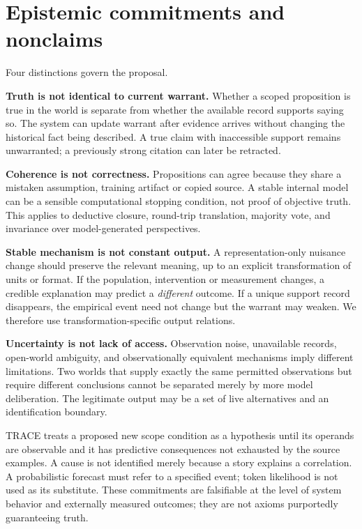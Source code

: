 \documentclass[11pt,a4paper]{article}
\begin{document}
\section{Epistemic commitments and
nonclaims}\label{epistemic-commitments-and-nonclaims}

Four distinctions govern the proposal.

\textbf{Truth is not identical to current warrant.} Whether a scoped
proposition is true in the world is separate from whether the available
record supports saying so. The system can update warrant after evidence
arrives without changing the historical fact being described. A true
claim with inaccessible support remains unwarranted; a previously strong
citation can later be retracted.

\textbf{Coherence is not correctness.} Propositions can agree because
they share a mistaken assumption, training artifact or copied source. A
stable internal model can be a sensible computational stopping
condition, not proof of objective truth. This applies to deductive
closure, round-trip translation, majority vote, and invariance over
model-generated perspectives.

\textbf{Stable mechanism is not constant output.} A representation-only
nuisance change should preserve the relevant meaning, up to an explicit
transformation of units or format. If the population, intervention or
measurement changes, a credible explanation may predict a
\emph{different} outcome. If a unique support record disappears, the
empirical event need not change but the warrant may weaken. We therefore
use transformation-specific output relations.

\textbf{Uncertainty is not lack of access.} Observation noise,
unavailable records, open-world ambiguity, and observationally
equivalent mechanisms imply different limitations. Two worlds that
supply exactly the same permitted observations but require different
conclusions cannot be separated merely by more model deliberation. The
legitimate output may be a set of live alternatives and an
identification boundary.

TRACE treats a proposed new scope condition as a hypothesis until its
operands are observable and it has predictive consequences not exhausted
by the source examples. A cause is not identified merely because a story
explains a correlation. A probabilistic forecast must refer to a
specified event; token likelihood is not used as its substitute. These
commitments are falsifiable at the level of system behavior and
externally measured outcomes; they are not axioms purportedly
guaranteeing truth.
\end{document}
